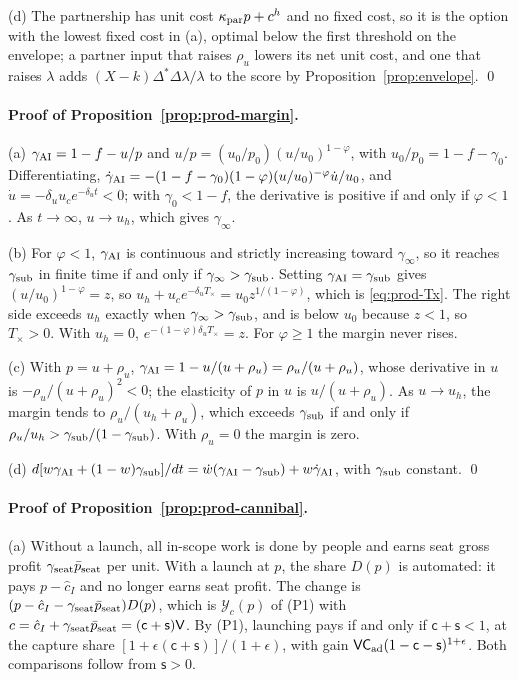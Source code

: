 (d) The partnership has unit cost $\kappa_{\rm par}p+c^h$ and no fixed cost, so it is the option with the lowest fixed cost in (a), optimal below the first threshold on the envelope; a partner input that raises $\rho_u$ lowers its net unit cost, and one that raises $\lambda$ adds $(X-k)\Delta^*\Delta\lambda/\lambda$ to the score by Proposition~\ref{prop:envelope}. \qed

\paragraph{Proof of Proposition~\ref{prop:prod-margin}.}
(a) $\gamma_{\rm AI}=1-f-u/p$ and $u/p=(u_0/p_0)(u/u_0)^{1-\varphi}$, with $u_0/p_0=1-f-\gamma_0$. Differentiating, $\dot\gamma_{\rm AI}=-(1-f-\gamma_0)(1-\varphi)(u/u_0)^{-\varphi}\dot u/u_0$, and $\dot u=-\delta_uu_ce^{-\delta_ut}<0$; with $\gamma_0<1-f$, the derivative is positive if and only if $\varphi<1$. As $t\to\infty$, $u\to u_h$, which gives $\gamma_\infty$.

(b) For $\varphi<1$, $\gamma_{\rm AI}$ is continuous and strictly increasing toward $\gamma_\infty$, so it reaches $\gamma_{\rm sub}$ in finite time if and only if $\gamma_\infty>\gamma_{\rm sub}$. Setting $\gamma_{\rm AI}=\gamma_{\rm sub}$ gives $(u/u_0)^{1-\varphi}=z$, so $u_h+u_ce^{-\delta_uT_\times}=u_0z^{1/(1-\varphi)}$, which is \eqref{eq:prod-Tx}. The right side exceeds $u_h$ exactly when $\gamma_\infty>\gamma_{\rm sub}$, and is below $u_0$ because $z<1$, so $T_\times>0$. With $u_h=0$, $e^{-(1-\varphi)\delta_uT_\times}=z$. For $\varphi\ge 1$ the margin never rises.

(c) With $p=u+\rho_u$, $\gamma_{\rm AI}=1-u/(u+\rho_u)=\rho_u/(u+\rho_u)$, whose derivative in $u$ is $-\rho_u/(u+\rho_u)^2<0$; the elasticity of $p$ in $u$ is $u/(u+\rho_u)$. As $u\to u_h$, the margin tends to $\rho_u/(u_h+\rho_u)$, which exceeds $\gamma_{\rm sub}$ if and only if $\rho_u/u_h>\gamma_{\rm sub}/(1-\gamma_{\rm sub})$. With $\rho_u=0$ the margin is zero.

(d) $d[w\gamma_{\rm AI}+(1-w)\gamma_{\rm sub}]/dt=\dot w(\gamma_{\rm AI}-\gamma_{\rm sub})+w\dot\gamma_{\rm AI}$, with $\gamma_{\rm sub}$ constant. \qed

\paragraph{Proof of Proposition~\ref{prop:prod-cannibal}.}
(a) Without a launch, all in-scope work is done by people and earns seat gross profit $\gamma_{\rm seat}\bar p_{\rm seat}$ per unit. With a launch at $p$, the share $D(p)$ is automated: it pays $p-\hat c_I$ and no longer earns seat profit. The change is $(p-\hat c_I-\gamma_{\rm seat}\bar p_{\rm seat})D(p)$, which is $\mathcal Y_c(p)$ of (P1) with $c=\hat c_I+\gamma_{\rm seat}\bar p_{\rm seat}=(\mathsf c+\mathsf s)\mathsf V$. By (P1), launching pays if and only if $\mathsf c+\mathsf s<1$, at the capture share $[1+\epsilon(\mathsf c+\mathsf s)]/(1+\epsilon)$, with gain $\mathsf V\mathsf C_{\rm ad}(1-\mathsf c-\mathsf s)^{1+\epsilon}$. Both comparisons follow from $\mathsf s>0$.

